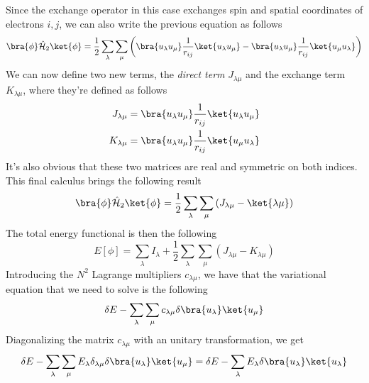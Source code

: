 \documentclass[../qm.tex]{subfiles}
\begin{document}
	Since the exchange operator in this case exchanges spin and spatial coordinates of electrons $i,j$, we can also write the previous equation as follows
	\begin{equation}
		\bra{\phi}\opr{\ham}_2\ket{\phi}=\frac{1}{2}\sum_{\lambda}\sum_{\mu}\left( \bra{u_\lambda u_\mu}\frac{1}{r_{ij}}\ket{u_\lambda u_\mu}-\bra{u_\lambda u_\mu}\frac{1}{r_{ij}}\ket{u_\mu u_\lambda} \right)
		\label{eq:eqecxchangeintegralhftheory}
	\end{equation}
	We can now define two new terms, the \textit{direct term} $J_{\lambda \mu}$ and the exchange term $K_{\lambda \mu}$, where they're defined as follows
	\begin{equation}
		\begin{aligned}
			J_{\lambda \mu}&=\bra{u_\lambda u_\mu}\frac{1}{r_{ij}}\ket{u_\lambda u_\mu}\\
			K_{\lambda \mu}&=\bra{u_\lambda u_\mu}\frac{1}{r_{ij}}\ket{u_\mu u_\lambda}
		\end{aligned}
		\label{eq:exchangedirectoperatormatrices}
	\end{equation}
	It's also obvious that these two matrices are real and symmetric on both indices.\\
	This final calculus brings the following result
	\begin{equation}
		\bra{\phi}\opr{\ham}_2\ket{\phi}=\frac{1}{2}\sum_{\lambda}\sum_{\mu}\left( J_{\lambda \mu}-\ket{\lambda \mu} \right)
		\label{eq:hfintegralsham2}
	\end{equation}
	The total energy functional is then the following
	\begin{equation}
		E[\phi]=\sum_{\lambda}I_\lambda+\frac{1}{2}\sum_{\lambda}\sum_{\mu}\left( J_{\lambda \mu}-K_{\lambda \mu} \right)
		\label{eq:energyfunctionalhftheory}
	\end{equation}
	Introducing the $N^2$ Lagrange multipliers $c_{\lambda\mu}$, we have that the variational equation that we need to solve is the following
	\begin{equation}
		\delta E-\sum_{\lambda}\sum_{\mu}c_{\lambda\mu}\delta\bra{u_\lambda}\ket{u_\mu}
		\label{eq:hfvariationalenergy}
	\end{equation}
	Diagonalizing the matrix $c_{\lambda\mu}$ with an unitary transformation, we get
	\begin{equation}
		\delta E-\sum_{\lambda}\sum_{\mu}E_{\lambda}\kd{\lambda\mu}\delta\bra{u_\lambda}\ket{u_\mu}=\delta E-\sum_{\lambda}E_{\lambda}\delta\bra{u_{\lambda}}\ket{u_{\lambda}}
		\label{eq:diagonalizedlagrangematrix}
	\end{equation}
\end{document}
